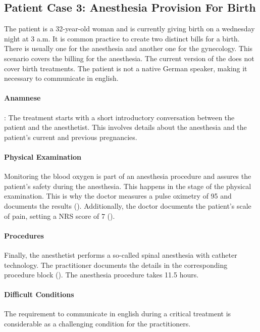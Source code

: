 \subsection{Patient Case 3: Anesthesia Provision For Birth}\label{subsec:patient-case-3:-anesthesia-for-birth}
The patient is a 32-year-old woman and is currently giving birth on a wednesday night at 3 a.m.
It is common practice to create two distinct bills for a birth.
There is usually one for the anesthesia and another one for the gynecology.
This scenario covers the billing for the anesthesia.
The current version of the \AVS does not cover birth treatments.
The patient is not a native German speaker, making it necessary to communicate in english.

\paragraph{Anamnese}:
The treatment starts with a short introductory conversation between the patient and the anesthetist.
This involves details about the anesthesia and the patient's current and previous pregnancies.

\paragraph{Physical Examination}
Monitoring the blood oxygen is part of an anesthesia procedure and assures the patient's safety during the anesthesia.
This happens in the stage of the physical examination.
This is why the doctor measures a pulse oximetry of 95 and documents the results ().
Additionally, the doctor documents the patient's scale of pain, setting a NRS score of 7 ().

\paragraph{Procedures}
Finally, the anesthetist performs a so-called spinal anesthesia with catheter technology.
The practitioner documents the details in the corresponding procedure block ().
The anesthesia procedure takes 11.5 hours.

\paragraph{Difficult Conditions}
The requirement to communicate in english during a critical treatment is considerable as a challenging condition for the practitioners.


